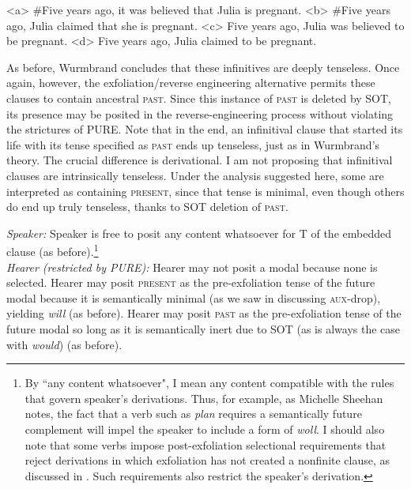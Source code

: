 \documentclass[output=paper]{langscibook}
\begin{document}
\a<a>  \ljudge\#Five years ago, it was believed that Julia is pregnant.
\a<b>  \ljudge\#Five years ago, Julia claimed that she is pregnant.
\a<c>  Five years ago, Julia was believed to be pregnant.
\a<d>  Five years ago, Julia claimed to be pregnant.
\xe

\noindent As before, Wurmbrand concludes that these infinitives are deeply tenseless. Once again, however, the exfoliation/reverse engineering alternative permits these clauses to contain ancestral \textsc{past}. Since this instance of \textsc{past} is deleted by SOT, its presence may be posited in the reverse-engineering process without violating the strictures of PURE. Note that in the end, an infinitival clause that started its life with its tense specified as \textsc{past} ends up tenseless, just as in Wurmbrand's theory. The crucial difference is derivational. I am not proposing that infinitival clauses are intrinsically tenseless. Under the analysis suggested here, some are interpreted as containing \textsc{present}, since that tense is minimal, even though others do end  up truly tenseless, thanks to SOT deletion of \textsc{past}. 

\pex
{}\medbreak
\textit{Speaker:} Speaker is free to posit any content whatsoever for T of the embedded clause (as before).\footnote{By ``any content whatsoever", I mean any content compatible with the rules that govern speaker's derivations.  Thus, for example, as Michelle Sheehan notes, the fact that a verb such as \textit{plan} requires a semantically future complement will impel the speaker to include a form of \textit{woll}. I should also note that some verbs impose post-exfoliation selectional requirements that reject derivations in which exfoliation has not created a nonfinite clause, as discussed in \citet{Pesetsky:2019aa}. Such requirements also restrict the speaker's derivation.}\\
\textit{Hearer (restricted by PURE):}
\a Hearer may not posit a modal because none is selected.
\a Hearer may posit \textsc{present} as the pre-exfoliation tense of the future modal because it is semantically minimal (as we saw in discussing \textsc{aux}-drop), yielding \textit{will} (as before).
\a Hearer may posit \textsc{past} as the pre-exfoliation tense of the future modal so long as it is semantically inert due to SOT (as is always the case with \textit{would}) (as before).
\xe
\end{document}
